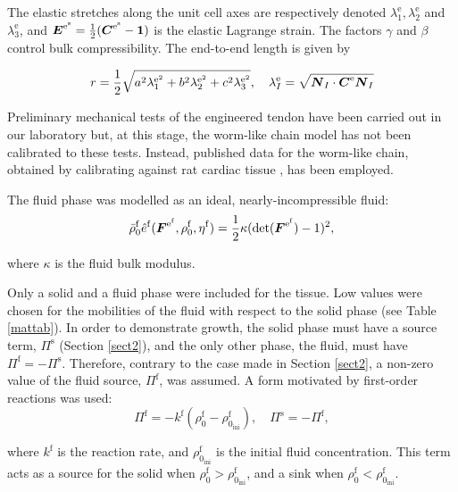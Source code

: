 The elastic stretches along the unit cell axes are respectively
denoted $\lambda^\mathrm{e}_1,\lambda^\mathrm{e}_2$ and
$\lambda^\mathrm{e}_3$, and $\mbox{\boldmath$ E$}^{\mathrm{e}^\mathrm{s}} =
\frac{1}{2}(\mbox{\boldmath$ C$}^{\mathrm{e}^\mathrm{s}} - {\bf 1})$ is the elastic
Lagrange strain. The factors $\gamma$ and $\beta$ control bulk
compressibility. The end-to-end length is given by

\begin{equation}
r =
\frac{1}{2}\sqrt{a^2\lambda_1^{\mathrm{e}^2}+b^2\lambda_2^{\mathrm{e}^2}+c^2\lambda_3^{\mathrm{e}^2}},\quad
\lambda_I^{\mathrm{e}} = \sqrt{\mbox{\boldmath$ N$}_I\cdot\mbox{\boldmath$ C$}^{\mathrm{e}}\mbox{\boldmath$ N$}_I}
\label{rwlcm}
\end{equation}

Preliminary mechanical tests of the engineered tendon have been
carried out in our laboratory but, at this stage, the worm-like
chain model has not been calibrated to these tests. Instead,
published data for the worm-like chain, obtained by calibrating
against rat cardiac tissue  \citep{Bischoffetal:2002}, has been
employed.

The fluid phase was modelled as an ideal, nearly-incompressible
fluid:
\begin{equation}
\bar{\rho}^\mathrm{f}_0\hat{e}^\mathrm{f}(\mbox{\boldmath$ F$}^{\mathrm{e}^\mathrm{f}},\rho_0^\mathrm{f},\eta^\mathrm{f})
=
\frac{1}{2}\kappa(\mathrm{det}(\mbox{\boldmath$ F$}^{\mathrm{e}^\mathrm{f}})-1)^2,
\end{equation}

\noindent where $\kappa$ is the fluid bulk modulus.

Only a solid and a fluid phase were included for the tissue. Low
values were chosen for the mobilities of the fluid
\citep{Swartzetal:99} with respect to the solid phase (see Table
\ref{mattab}). In order to demonstrate growth, the solid phase
must have a source term, $\Pi^\mathrm{s}$ (Section \ref{sect2}),
and the only other phase, the fluid, must have $\Pi^\mathrm{f} =
-\Pi^\mathrm{s}$. Therefore, contrary to the case made in Section
\ref{sect2}, a non-zero value of the fluid source,
$\Pi^\mathrm{f}$, was assumed. A form motivated by first-order
reactions was used:
\begin{equation}
\Pi^\mathrm{f} = -k^\mathrm{f}(\rho_0^\mathrm{f} -
\rho_{0_\mathrm{ini}}^\mathrm{f}),\quad \Pi^\mathrm{s} =
-\Pi^\mathrm{f}, \label{piform}
\end{equation}

\noindent where $k^\mathrm{f}$ is the reaction rate, and
$\rho_{0_\mathrm{ini}}^\mathrm{f}$ is the initial fluid
concentration. This term acts as a source for the solid when
$\rho_0^\mathrm{f}
> \rho_{0_\mathrm{ini}}^\mathrm{f}$, and a sink when
$\rho_0^\mathrm{f} < \rho_{0_\mathrm{ini}}^\mathrm{f}$.

